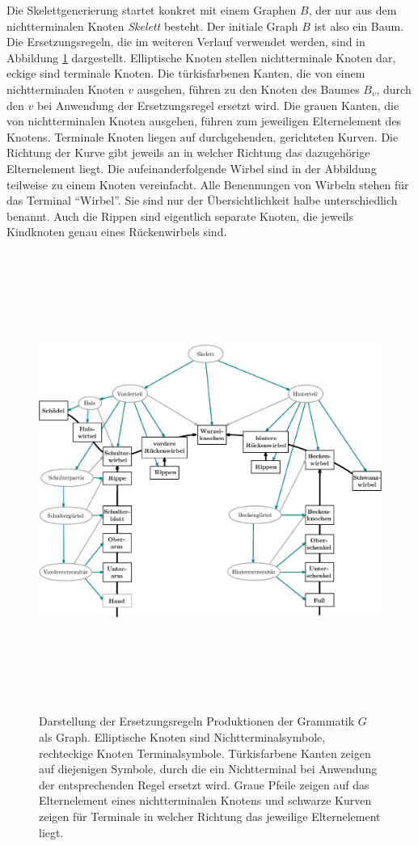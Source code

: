 Die Skelettgenerierung startet konkret mit einem Graphen $B$, der nur aus dem nichtterminalen Knoten \emph{Skelett} besteht. Der initiale Graph $B$ ist also ein Baum.
Die Ersetzungsregeln, die im weiteren Verlauf verwendet werden, sind in Abbildung \ref{grammar_graph} dargestellt. 
Elliptische Knoten stellen nichtterminale Knoten dar, eckige sind terminale Knoten. Die türkisfarbenen Kanten, die von einem nichtterminalen Knoten $v$ ausgehen, führen zu den Knoten des Baumes $B_v$, durch den $v$ bei Anwendung der Ersetzungsregel ersetzt wird. Die grauen Kanten, die von nichtterminalen Knoten ausgehen, führen zum jeweiligen Elternelement des Knotens. Terminale Knoten liegen auf durchgehenden, gerichteten Kurven. Die Richtung der Kurve gibt jeweils an in welcher Richtung das dazugehörige Elternelement liegt.
Die aufeinanderfolgende Wirbel sind in der Abbildung teilweise zu einem Knoten vereinfacht. Alle Benennungen von Wirbeln stehen für das Terminal "`Wirbel"'. Sie sind nur der Übersichtlichkeit halbe unterschiedlich benannt. Auch die Rippen sind eigentlich separate Knoten, die jeweils Kindknoten genau eines Rückenwirbels sind.

 \begin{figure}
  \centering
  \includegraphics[height=15cm, angle=90, origin=c]{graphics/grammarGraph}
  \caption{Darstellung der Ersetzungsregeln \bzw Produktionen der Grammatik $G$ als Graph. Elliptische Knoten sind Nichtterminalsymbole, rechteckige Knoten Terminalsymbole. Türkisfarbene Kanten zeigen auf diejenigen Symbole, durch die ein Nichtterminal bei Anwendung der entsprechenden Regel ersetzt wird. Graue Pfeile zeigen auf das Elternelement eines nichtterminalen Knotens und schwarze Kurven zeigen für Terminale in welcher Richtung das jeweilige Elternelement liegt.}
  \label{grammar_graph}
 \end{figure}

